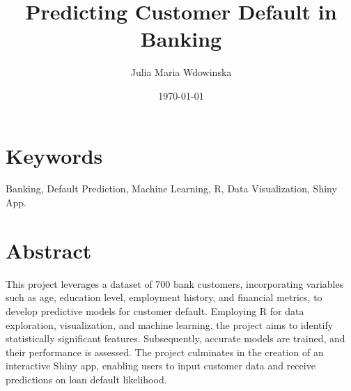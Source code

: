 \documentclass{article}
\title{Predicting Customer Default in Banking}
\author{Julia Maria Wdowinska}
\date{\today}
\begin{document}
\maketitle

\section*{Keywords}
Banking, Default Prediction, Machine Learning, R, Data Visualization, Shiny App.

\section*{Abstract}
This project leverages a dataset of 700 bank customers, incorporating variables such as age, education level, employment history, and financial metrics, to develop predictive models for customer default. Employing R for data exploration, visualization, and machine learning, the project aims to identify statistically significant features. Subsequently, accurate models are trained, and their performance is assessed. The project culminates in the creation of an interactive Shiny app, enabling users to input customer data and receive predictions on loan default likelihood. 
\end{document}
